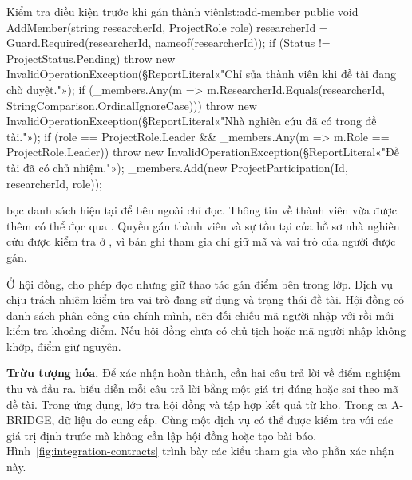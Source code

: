 \begin{ReportCode}[firstnumber=68,commandchars=§«»]{Kiểm tra điều kiện trước khi gán thành viên}{lst:add-member}
    public void AddMember(string researcherId, ProjectRole role)
    {
        researcherId = Guard.Required(researcherId, nameof(researcherId));
        if (Status != ProjectStatus.Pending) throw new InvalidOperationException(§ReportLiteral«"Chỉ sửa thành viên khi đề tài đang chờ duyệt."»);
        if (_members.Any(m => m.ResearcherId.Equals(researcherId, StringComparison.OrdinalIgnoreCase)))
            throw new InvalidOperationException(§ReportLiteral«"Nhà nghiên cứu đã có trong đề tài."»);
        if (role == ProjectRole.Leader && _members.Any(m => m.Role == ProjectRole.Leader))
            throw new InvalidOperationException(§ReportLiteral«"Đề tài đã có chủ nhiệm."»);
        _members.Add(new ProjectParticipation(Id, researcherId, role));
    }
\end{ReportCode}


 bọc danh sách hiện tại để bên ngoài chỉ đọc. Thông tin về thành viên vừa được thêm có thể đọc qua . Quyền gán thành viên và sự tồn tại của hồ sơ nhà nghiên cứu được kiểm tra ở , vì bản ghi tham gia chỉ giữ mã và vai trò của người được gán.

Ở hội đồng,  cho phép đọc  nhưng giữ thao tác gán điểm bên trong lớp. Dịch vụ chịu trách nhiệm kiểm tra vai trò đang sử dụng và trạng thái đề tài. Hội đồng có danh sách phân công của chính mình, nên  đối chiếu mã người nhập với  rồi mới kiểm tra khoảng điểm. Nếu hội đồng chưa có chủ tịch hoặc mã người nhập không khớp, điểm giữ nguyên.

\textbf{Trừu tượng hóa.} Để xác nhận hoàn thành,  cần hai câu trả lời về điểm nghiệm thu và đầu ra.  biểu diễn mỗi câu trả lời bằng một giá trị đúng hoặc sai theo mã đề tài. Trong ứng dụng, lớp  tra hội đồng và tập hợp kết quả từ kho. Trong ca A-BRIDGE, dữ liệu do  cung cấp. Cùng một dịch vụ có thể được kiểm tra với các giá trị định trước mà không cần lập hội đồng hoặc tạo bài báo. Hình~\ref{fig:integration-contracts} trình bày các kiểu tham gia vào phần xác nhận này.



